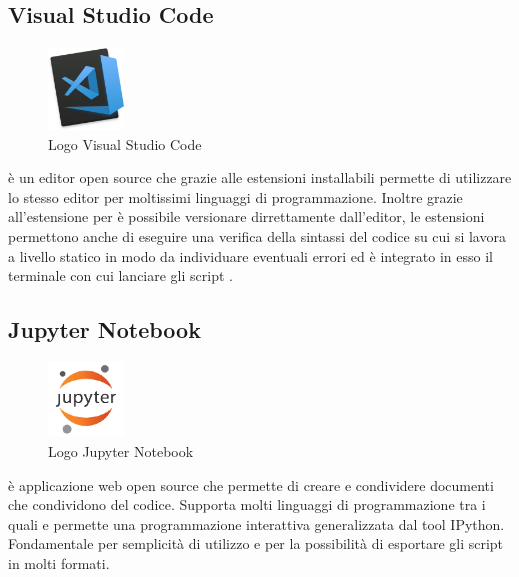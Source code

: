 \subsection{Visual Studio Code}
\begin{figure}[H]
	\begin{center} \includegraphics[width=2cm]{figures/Visual_Studio_code}
		\caption[Logo Visual Studio Code]{Logo Visual Studio Code}
	\end{center}
\end{figure}
 è un editor open source che grazie alle estensioni installabili permette di utilizzare lo stesso editor per moltissimi linguaggi di programmazione. Inoltre grazie all'estensione per  è possibile versionare dirrettamente dall'editor, le estensioni permettono anche di eseguire una verifica della sintassi del codice su cui si lavora a livello statico in modo da individuare eventuali errori ed è integrato in esso il terminale con cui lanciare gli script .

\subsection{Jupyter Notebook}
\begin{figure}[H]
	\begin{center} \includegraphics[width=2cm]{figures/jupyter}
		\caption[Logo Jupyter Notebook]{Logo Jupyter Notebook}
	\end{center}
\end{figure}
 è applicazione web open source che permette di creare e condividere documenti che condividono del codice. Supporta molti linguaggi di programmazione tra i quali  e permette una programmazione interattiva generalizzata dal tool IPython. Fondamentale per semplicità di utilizzo e per la possibilità di esportare gli script in molti formati.

